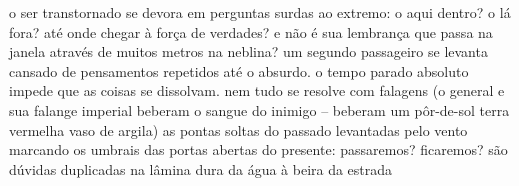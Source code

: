 \begin{poem}
\begin{stanza}
o ser transtornado\verseline
se devora em perguntas\verseline
surdas ao extremo:\verseline
o aqui dentro? o lá fora?\verseline
até onde chegar\verseline
à força de verdades?\verseline
e não é sua lembrança\verseline
que passa na janela\verseline
através de muitos metros\verseline
na neblina?\verseline
um segundo passageiro\verseline
se levanta\verseline
cansado de pensamentos repetidos\verseline
até o absurdo.\verseline
o tempo parado\verseline
absoluto\verseline
impede que as coisas\verseline
se dissolvam.\verseline
nem tudo se resolve\verseline
com falagens\verseline
(o general e sua\verseline
falange imperial\verseline
beberam o sangue\verseline
do inimigo –\verseline
beberam um pôr-de-sol\verseline
terra vermelha\verseline
vaso de argila)\verseline
as pontas soltas do passado\verseline
levantadas pelo vento\verseline
marcando os umbrais\verseline
das portas abertas do presente:\verseline
passaremos? ficaremos?\verseline
são dúvidas duplicadas\verseline
na lâmina dura da água\verseline
à beira da estrada
\end{stanza}
\end{poem}